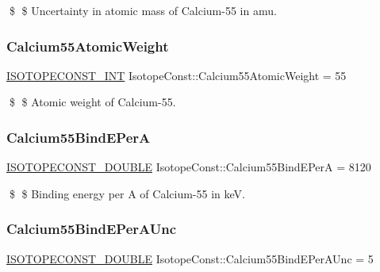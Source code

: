 \$ \$ Uncertainty in atomic mass of Calcium-\/55 in amu. \mbox{\label{group___isotope_const-_calcium-_ca55_ga059bea63a9dda70013fb929957ebf18c}} 
\subsubsection{\texorpdfstring{Calcium55\+Atomic\+Weight}{Calcium55AtomicWeight}}
{\footnotesize\ttfamily \mbox{\hyperlink{group___isotope_const-_macros_ga5f18360b3e99483a35c32d789e62621c}{I\+S\+O\+T\+O\+P\+E\+C\+O\+N\+S\+T\+\_\+\+I\+NT}} Isotope\+Const\+::\+Calcium55\+Atomic\+Weight = 55}

\$ \$ Atomic weight of Calcium-\/55. \mbox{\label{group___isotope_const-_calcium-_ca55_ga25360d88207c049f83528a562c845474}} 
\subsubsection{\texorpdfstring{Calcium55\+Bind\+E\+PerA}{Calcium55BindEPerA}}
{\footnotesize\ttfamily \mbox{\hyperlink{group___isotope_const-_macros_ga8f45a7272ce02c0b4c65c44636ed719a}{I\+S\+O\+T\+O\+P\+E\+C\+O\+N\+S\+T\+\_\+\+D\+O\+U\+B\+LE}} Isotope\+Const\+::\+Calcium55\+Bind\+E\+PerA = 8120}

\$ \$ Binding energy per A of Calcium-\/55 in keV. \mbox{\label{group___isotope_const-_calcium-_ca55_ga31923acab9b658c16c22126e461cc41c}} 
\subsubsection{\texorpdfstring{Calcium55\+Bind\+E\+Per\+A\+Unc}{Calcium55BindEPerAUnc}}
{\footnotesize\ttfamily \mbox{\hyperlink{group___isotope_const-_macros_ga8f45a7272ce02c0b4c65c44636ed719a}{I\+S\+O\+T\+O\+P\+E\+C\+O\+N\+S\+T\+\_\+\+D\+O\+U\+B\+LE}} Isotope\+Const\+::\+Calcium55\+Bind\+E\+Per\+A\+Unc = 5}

